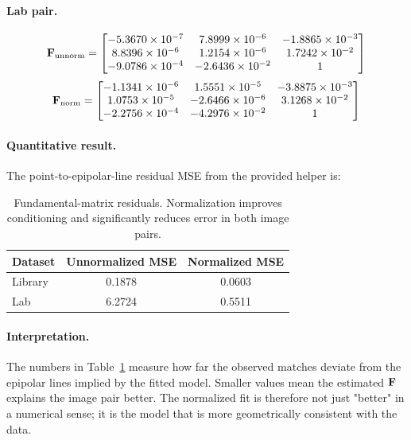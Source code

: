 {\paragraph{Lab pair.}
\begin{equation*}
\mathbf{F}_{\text{unnorm}} =
\begin{bmatrix}
-5.3670\times 10^{-7} & 7.8999\times 10^{-6} & -1.8865\times 10^{-3}\\
8.8396\times 10^{-6} & 1.2154\times 10^{-6} & 1.7242\times 10^{-2}\\
-9.0786\times 10^{-4} & -2.6436\times 10^{-2} & 1
\end{bmatrix}
\end{equation*}
\begin{equation*}
\mathbf{F}_{\text{norm}} =
\begin{bmatrix}
-1.1341\times 10^{-6} & 1.5551\times 10^{-5} & -3.8875\times 10^{-3}\\
1.0753\times 10^{-5} & -2.6466\times 10^{-6} & 3.1268\times 10^{-2}\\
-2.2756\times 10^{-4} & -4.2976\times 10^{-2} & 1
\end{bmatrix}
\end{equation*}

\paragraph{Quantitative result.}
The point-to-epipolar-line residual MSE from the provided helper is:
\begin{table}[h]
\centering
\begin{tabular}{lcc}
\hline
Dataset & Unnormalized MSE & Normalized MSE \\
\hline
Library & 0.1878 & 0.0603 \\
Lab & 6.2724 & 0.5511 \\
\hline
\end{tabular}
\caption{Fundamental-matrix residuals. Normalization improves conditioning and significantly reduces error in both image pairs.}
\label{tab:f_mse}
\end{table}

\paragraph{Interpretation.}
The numbers in Table~\ref{tab:f_mse} measure how far the observed matches deviate from the epipolar lines implied by the fitted model. Smaller values mean the estimated $\mathbf{F}$ explains the image pair better. The normalized fit is therefore not just "better" in a numerical sense; it is the model that is more geometrically consistent with the data.

}
